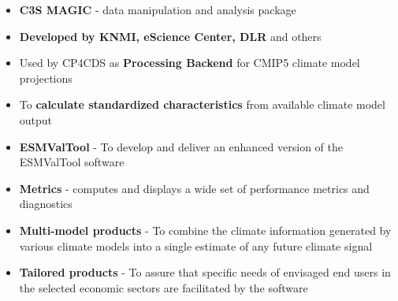 \documentclass[landscape,a0paper,fontscale=0.4]{baposter} %
\newcommand{\compresslist}{%
\setlength{\itemsep}{1pt}%
\setlength{\parskip}{0pt}%
\setlength{\parsep}{0pt}%
}
\begin{document}
\begin{poster}
{    %
    \begin{itemize}\compresslist
      \item {\bf C3S MAGIC} - data manipulation and analysis package
      \item {\bf Developed by KNMI, eScience Center, DLR} and others
      \item Used by CP4CDS as {\bf Processing Backend} for CMIP5 climate model projections
      \item To {\bf calculate standardized characteristics}
          from available climate model output
      \item {\bf ESMValTool} - To develop and deliver an enhanced version of the ESMValTool software
      \item {\bf Metrics} - computes and displays a wide set of performance metrics and diagnostics
      \item {\bf Multi-model products} - To combine the climate information generated by various climate models
        into a single estimate of any future climate signal
      \item {\bf Tailored products} - To assure that specific needs of envisaged end users in the selected economic
        sectors
        are facilitated by the software
    \end{itemize}

}

\end{poster}
\end{document}
